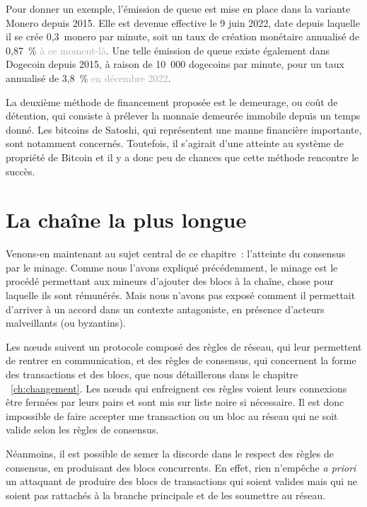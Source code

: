 Pour donner un exemple, l'émission de queue est mise en place dans la variante Monero depuis 2015. Elle est devenue effective le 9 juin 2022, date depuis laquelle il se crée 0,3~monero par minute, soit un taux de création monétaire annualisé de 0,87~\% \textcolor{darkgray}{à ce moment-là}. Une telle émission de queue existe également dans Dogecoin depuis 2015, à raison de 10~000 dogecoins par minute, pour un taux annualisé de 3,8~\% \textcolor{darkgray}{en décembre 2022}.

La deuxième méthode de financement proposée est le demeurage, ou coût de détention, qui consiste à prélever la monnaie demeurée immobile depuis un temps donné. Les bitcoins de Satoshi, qui représentent une manne financière importante, sont notamment concernés. Toutefois, il s'agirait d'une atteinte au système de propriété de Bitcoin et il y a donc peu de chances que cette méthode rencontre le succès.

\section*{La chaîne la plus longue}

Venons-en maintenant au sujet central de ce chapitre~: l'atteinte du consensus par le minage. Comme nous l'avons expliqué précédemment, le minage est le procédé permettant aux mineurs d'ajouter des blocs à la chaîne, chose pour laquelle ils sont rémunérés. Mais nous n'avons pas exposé comment il permettait d'arriver à un accord dans un contexte antagoniste, en présence d'acteurs malveillants (ou byzantins).

Les nœuds suivent un protocole composé des règles de réseau, qui leur permettent de rentrer en communication, et des règles de consensus, qui concernent la forme des transactions et des blocs, que nous détaillerons dans le chapitre ~\ref{ch:changement}. Les nœuds qui enfreignent ces règles voient leurs connexions être fermées par leurs pairs et sont mis sur liste noire si nécessaire. Il est donc impossible de faire accepter une transaction ou un bloc au réseau qui ne soit valide selon les règles de consensus.

Néanmoins, il est possible de semer la discorde dans le respect des règles de consensus, en produisant des blocs concurrents. En effet, rien n'empêche \emph{a priori} un attaquant de produire des blocs de transactions qui soient valides mais qui ne soient pas rattachés à la branche principale et de les soumettre au réseau.

